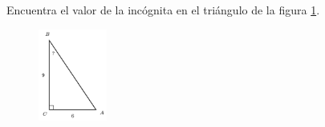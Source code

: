 \question[15]  Encuentra el valor de la incógnita en el triángulo de la figura \ref{fig:angle_functrig_25}.
\begin{figure}[H]
    \begin{center}
        \includegraphics[width=0.2\textwidth]{../images/angle_functrig_25.png}
    \end{center}
    \caption{}
    \label{fig:angle_functrig_25}
\end{figure}